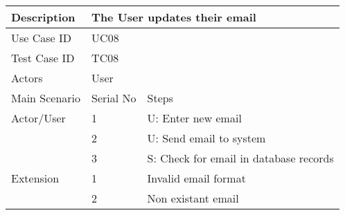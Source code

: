 \begin{table}[]
    \centering
    \begin{tabular}{|l|llll|}
        \hline
        Description   & \multicolumn{4}{l|}{The User updates their email}                                                               \\ \hline
        Use Case ID   & \multicolumn{4}{l|}{UC08}                                                                                       \\ \hline
        Test Case ID  & \multicolumn{4}{l|}{TC08}                                                                                       \\ \hline
        Actors        & \multicolumn{4}{l|}{User}                                                                                       \\ \hline
        Main Scenario & \multicolumn{1}{l|}{Serial No}                    & \multicolumn{3}{l|}{Steps}                                  \\ \hline
        Actor/User    & \multicolumn{1}{l|}{1}                            & \multicolumn{3}{l|}{U: Enter new email}                     \\ \hline
                      & \multicolumn{1}{l|}{2}                            & \multicolumn{3}{l|}{U: Send email to system}                \\ \hline
                      & \multicolumn{1}{l|}{3}                            & \multicolumn{3}{l|}{S: Check for email in database records} \\ \hline
        Extension     & \multicolumn{1}{l|}{1}                            & \multicolumn{3}{l|}{Invalid email format}                   \\ \hline
                      & \multicolumn{1}{l|}{2}                            & \multicolumn{3}{l|}{Non existant email}                     \\ \hline
    \end{tabular}
\end{table}

